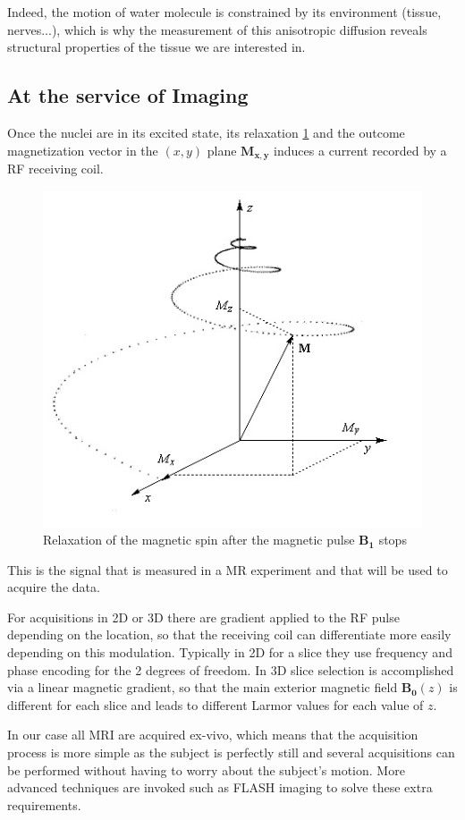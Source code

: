 Indeed, the motion of water molecule is constrained by its environment (tissue, nerves...), which is why the measurement of this anisotropic diffusion reveals structural properties of the tissue we are interested in.

\subsection{At the service of Imaging}

Once the nuclei are in its excited state, its relaxation \ref{fig:spin_relaxation} and the outcome magnetization vector in the $(x, y)$ plane $\mathbf{M_{x, y}}$ induces a current recorded by a RF receiving coil.
\begin{figure}
    \centering
    \includegraphics[width=.5\textwidth]{figures/spin_relaxation}
    \caption{Relaxation of the magnetic spin after the magnetic pulse $\mathbf{B_1}$ stops}
    \label{fig:spin_relaxation}
\end{figure}

This is the signal that is measured in a MR experiment and that will be used to acquire the data.

For acquisitions in 2D or 3D there are gradient applied to the RF pulse depending on the location, so that the receiving coil can differentiate more easily depending on this modulation. Typically in 2D for a slice they use frequency and phase encoding for the 2 degrees of freedom. In 3D slice selection is accomplished via a linear magnetic gradient, so that the main exterior magnetic field $\mathbf{B_0}(z)$ is different for each slice and leads to different Larmor values for each value of $z$.

In our case all MRI are acquired ex-vivo, which means that the acquisition process is more simple as the subject is perfectly still and several acquisitions can be performed without having to worry about the subject's motion. More advanced techniques are invoked such as FLASH imaging to solve these extra requirements.

